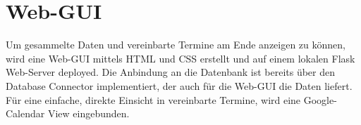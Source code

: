    
    \section{Web-GUI} \label{Realisierung: web gui}
        Um gesammelte Daten und vereinbarte Termine am Ende anzeigen zu können, wird eine Web-GUI mittels HTML und CSS erstellt und auf einem lokalen Flask Web-Server deployed. Die Anbindung an die Datenbank ist bereits über den Database Connector implementiert, der auch für die Web-GUI die Daten liefert. Für eine einfache, direkte Einsicht in vereinbarte Termine, wird eine Google-Calendar View eingebunden. 